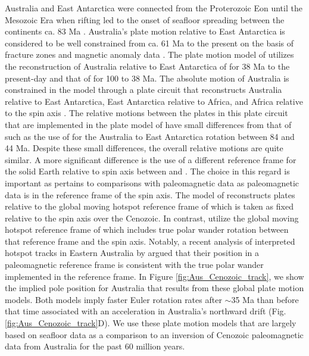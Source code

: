 \documentclass[]{agujournal2019}
\begin{document}
Australia and East Antarctica were connected from the Proterozoic Eon until the Mesozoic Era when rifting led to the onset of seafloor spreading between the continents ca. 83 Ma \cite{Williams2011a, Veevers2012a}. Australia's plate motion relative to East Antarctica is considered to be well constrained from ca. 61 Ma to the present on the basis of fracture zones and magnetic anomaly data \cite{Cande2004a}. The plate motion model of  utilizes the reconstruction of Australia relative to East Antarctica of  for 38 Ma to the present-day and that of  for 100 to 38 Ma. The absolute motion of Australia is constrained in the model through a plate circuit that reconstructs Australia relative to East Antarctica, East Antarctica relative to Africa, and Africa relative to the spin axis \cite{Muller2016a}. The relative motions between the plates in this plate circuit that are implemented in the plate model of  have small differences from that of  such as the use of  for the Australia to East Antarctica rotation between 84 and 44 Ma. Despite these small differences, the overall relative motions are quite similar. A more significant difference is the use of a different reference frame for the solid Earth relative to spin axis between  and . The choice in this regard is important as pertains to comparisons with paleomagnetic data as paleomagnetic data is in the reference frame of the spin axis. The model of  reconstructs plates relative to the global moving hotspot reference frame of  which is taken as fixed relative to the spin axis over the Cenozoic. In contrast,  utilize the global moving hotspot reference frame of  which includes true polar wander rotation between that reference frame and the spin axis. Notably, a recent analysis of interpreted hotspot tracks in Eastern Australia by  argued that their position in a paleomagnetic reference frame is consistent with the true polar wander implemented in the  reference frame. In Figure \ref{fig:Aus_Cenozoic_track}, we show the implied pole position for Australia that results from these global plate motion models. Both models imply faster Euler rotation rates after $\sim$35 Ma than before that time associated with an acceleration in Australia's northward drift (Fig. \ref{fig:Aus_Cenozoic_track}D). We use these plate motion models that are largely based on seafloor data as a comparison to an inversion of Cenozoic paleomagnetic data from Australia for the past 60 million years.
\end{document}
